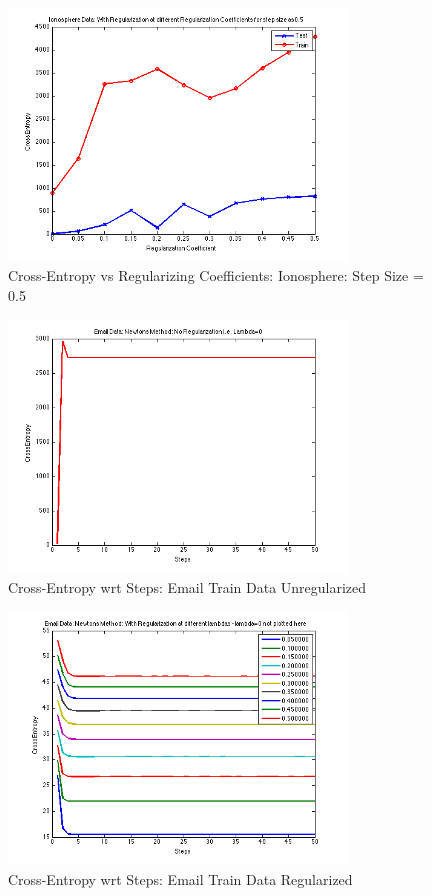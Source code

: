 \documentclass[paper=a4, fontsize=11pt]{scrartcl} %
\numberwithin{equation}{section} %
\numberwithin{figure}{section} %
\numberwithin{table}{section} %
\begin{document}
\begin{figure}[h!]
  \caption{Cross-Entropy vs Regularizing Coefficients: Ionosphere: Step Size = 0.5}
  \centering
    \includegraphics[width=0.8\textwidth]{../Pics/subGraphIono/Fig5.png}
\end{figure}



\begin{figure}[h!]
  \caption{Cross-Entropy wrt Steps: Email Train Data Unregularized}
  \centering
    \includegraphics[width=0.8\textwidth]{../Pics/newton/email_unreg.png}
\end{figure}

\begin{figure}[h!]
  \caption{Cross-Entropy wrt Steps: Email Train Data Regularized}
  \centering
    \includegraphics[width=0.8\textwidth]{../Pics/newton/email_reg.png}
\end{figure}
\end{document}
